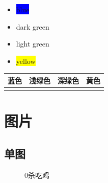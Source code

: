 \documentclass[12pt, a4paper, oneside]{ctexart}
\begin{document}
\begin{itemize}
    \item \colorbox{blue}{blue}
    \item \colorbox{dark_green}{dark green}
    \item \colorbox{light_green}{light green}
    \item \colorbox{yellow}{yellow}
\end{itemize}


\begin{table}[htbp]
    \centering
    \begin{tabular}{cccc}
        \toprule
        \textbf{蓝色}                      & \textbf{浅绿色}                            & \textbf{深绿色}                           & \textbf{黄色}                        \\
        \midrule
        \cellcolor{blue}\footnotemark[1] & \cellcolor{light_green}\footnotemark[2] & \cellcolor{dark_green}\footnotemark[3] & \cellcolor{yellow}\footnotemark[4] \\
        \bottomrule
    \end{tabular}
\end{table}

\newpage

\section{图片}
\subsection{单图}
\begin{figure} [htbp!]

    \caption{0杀吃鸡}
    \label{fig1}
\end{figure}
\end{document}
